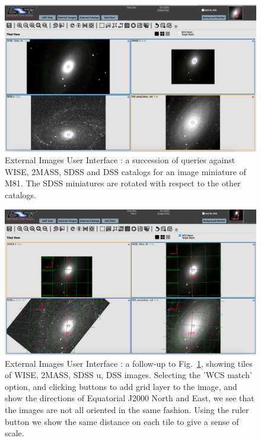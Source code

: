 \documentclass[DM,lsstdraft,toc,usenatbib]{lsstdoc}
\begin{document}
\begin{figure}
\includegraphics[width=\textwidth]{figs/external_images_m81_query.png}
\caption{External Images User Interface : a succession of queries against WISE, 2MASS, SDSS and DSS catalogs for an image miniature of M81. The SDSS miniatures are rotated with respect to the other catalogs. }
\label{fig:ext_images_m81}
\end{figure}

\begin{figure}
\includegraphics[width=\textwidth]{figs/external_images_m81_query_wcs.png}
\caption{External Images User Interface : a follow-up to Fig.~\ref{fig:ext_images_m81}, showing tiles of WISE, 2MASS, SDSS u, DSS images. Selecting  the 'WCS match' option, and clicking buttons to add grid layer to the image, and show the directions of Equatorial J2000 North and East, we see that the images are not all oriented in the same fashion. Using the ruler button we show the same distance on each tile to give a sense of scale.}
\label{fig:ext_images_m81_wcs}
\end{figure}
\end{document}
